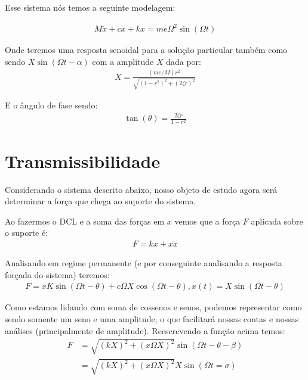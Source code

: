\documentclass{article}
\newcommand{\n}{\nonumber \\ }
\begin{document}
            Esse sistema nós temos a seguinte modelagem:

            \begin{align}
                M\ddot x + c \dot x + kx = me\Omega^2 \sin(\Omega t)
            \end{align}

            Onde teremos uma resposta senoidal para a solução particular também como sendo $X \sin{(\Omega t - \alpha)}$ com a amplitude $X$ dada por:
            \begin{align}
                X = \frac{(me/M) r^2}{\sqrt{(1-r^2)^2 + (2\zeta r)^2}}
            \end{align}

            E o ângulo de fase sendo:
            \begin{align}
                \tan{(\theta)} = \frac{2\zeta r}{ 1 - r^2}
            \end{align}

        \section{Transmissibilidade}
            Considerando o sistema descrito abaixo, nosso objeto de estudo agora será determinar a força que chega ao suporte do sistema.

            Ao fazermos o DCL e  a soma das forças em $x$ vemos que a força $F$ aplicada sobre o suporte é:
            \begin{align}
                F = kx + x\dot x
            \end{align}

            Analisando em regime permanente (e por conseguinte analisando a resposta forçada do sistema) teremos:
            \begin{align}
                F = xK\sin(\Omega t - \theta) + c \Omega X \cos(\Omega t - \theta) ,   x(t) = X\sin(\Omega t -\theta)
            \end{align}

            Como estamos lidando com soma de cossenos e senos, podemos representar como sendo somente um seno e uma amplitude, o que facilitará nossas contas e nossas análises (principalmente de
            amplitude). Reescrevendo a função acima temos:
            \begin{align}
                F &= \sqrt{(kX)^2 + (x\Omega X)^2} \sin(\Omega t - \theta - \beta) \n
                  &= \sqrt{(kX)^2 + (x\Omega X)^2}  X \sin(\Omega t = \sigma)
            \end{align}
\end{document}
